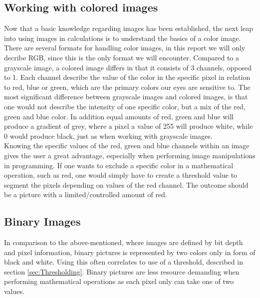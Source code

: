 \subsection{Working with colored images}
Now that a basic knowledge regarding images has been established, the next leap into using images in calculations is to understand the basics of a color image.\\
There are several formats for handling color images, in this report we will only decribe RGB, since this is the only format we will encounter. Compared to a grayscale image, a colored image differs in that it consists of 3 channels, opposed to 1. Each channel describe the value of the color in the specific pixel in relation to red, blue or green, which are the primary colors our eyes are sensitive to. The most significant difference between grayscale images and colored images, is that one would not describe the intensity of one specific color, but a mix of the red, green and blue color. In addition equal amounts of red, green and blue  will produce a gradient of grey, where a pixel a value of 255 will produce white, while 0 would produce black, just as when working with grayscale images.\\
Knowing the specific values of the red, green and blue channels within an image gives the user a great advantage, especially when performing image manipulations in programming. If one wants to exclude a specific color in a mathematical operation, such as red, one would simply have to create a threshold value to segment the pixels depending on values of the red channel. The outcome should be a picture with a limited/controlled amount of red. 

\subsection{Binary Images}
In comparison to the above-mentioned, where images are defined by bit depth and pixel information, binary pictures is represented by two colors only in form of black and white. Using this often correlates to use of a threshold, described in section \ref{sec:Thresholding}. Binary pictures are less resource demanding when performing mathematical operations as each pixel only can take one of two values.\\

